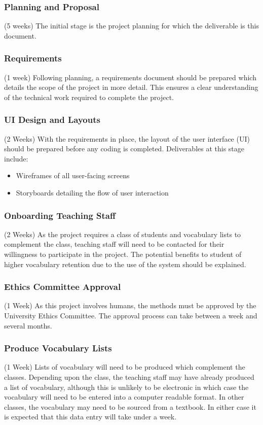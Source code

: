 \subsubsection{Planning and Proposal}
(5 weeks)
The initial stage is the project planning for which the deliverable is this document.

\subsubsection{Requirements}
(1 week)
Following planning, a requirements document should be prepared which details the scope of the project in more detail. This ensures a clear understanding of the technical work required to complete the project.

\subsubsection{UI Design and Layouts}
(2 Weeks)
With the requirements in place, the layout of the user interface (UI) should
be prepared before any coding is completed. Deliverables at this stage include:
\begin{itemize}
	\item Wireframes of all user-facing screens 
	\item Storyboards detailing the flow of user interaction
\end{itemize}

\subsubsection{Onboarding Teaching Staff}
(2 Weeks)
As the project requires a class of students and vocabulary lists to complement
the class, teaching staff will need to be contacted for their willingness to
participate in the project. The potential benefits to student of higher vocabulary
retention due to the use of the system should be explained.

\subsubsection{Ethics Committee Approval}
(1 Week)
As this project involves humans, the methods must be approved by the University
Ethics Committee. The approval process can take between a week and several
months.

\subsubsection{Produce Vocabulary Lists}
(1 Week)
Lists of vocabulary will need to be produced which complement the classes.
Depending upon the class, the teaching staff may have already produced a
list of vocabulary, although this is unlikely to be electronic in which case
the vocabulary will need to be entered into a computer readable format. In
other classes, the vocabulary may need to be sourced from a textbook. In either
case it is expected that this data entry will take under a week.

